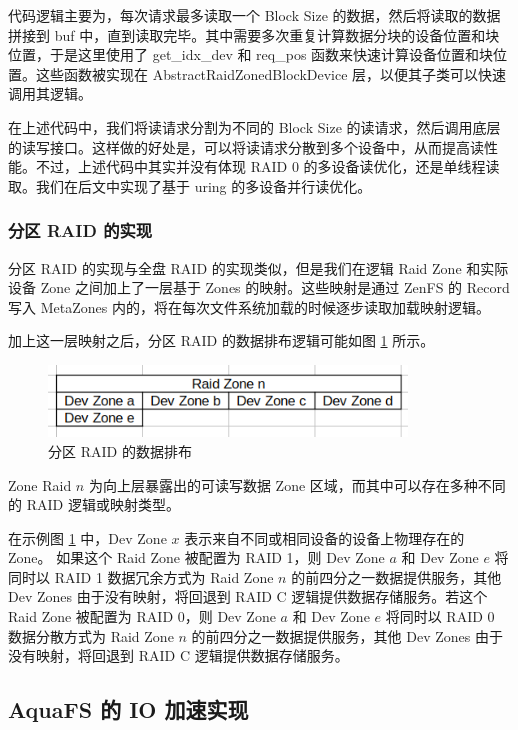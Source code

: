 代码逻辑主要为，每次请求最多读取一个 Block Size 的数据，然后将读取的数据拼接到 buf 中，直到读取完毕。其中需要多次重复计算数据分块的设备位置和块位置，于是这里使用了 get\_idx\_dev 和 req\_pos 函数来快速计算设备位置和块位置。这些函数被实现在 AbstractRaidZonedBlockDevice 层，以便其子类可以快速调用其逻辑。

在上述代码中，我们将读请求分割为不同的 Block Size 的读请求，然后调用底层的读写接口。这样做的好处是，可以将读请求分散到多个设备中，从而提高读性能。不过，上述代码中其实并没有体现 RAID 0 的多设备读优化，还是单线程读取。我们在后文中实现了基于 uring 的多设备并行读优化。

\subsubsection{分区 RAID 的实现}

分区 RAID 的实现与全盘 RAID 的实现类似，但是我们在逻辑 Raid Zone 和实际设备 Zone 之间加上了一层基于 Zones 的映射。这些映射是通过 ZenFS 的 Record 写入 MetaZones 内的，将在每次文件系统加载的时候逐步读取加载映射逻辑。

加上这一层映射之后，分区 RAID 的数据排布逻辑可能如图 \ref{raid-a} 所示。

\begin{figure}[htbp]
  \centering
  \includegraphics[width=0.85\textwidth]{fig/raid-a.png}
  \caption{ 分区 RAID 的数据排布 }
  \label{raid-a}
\end{figure}

Zone Raid $n$ 为向上层暴露出的可读写数据 Zone 区域，而其中可以存在多种不同的 RAID 逻辑或映射类型。

在示例图 \ref{raid-a} 中，Dev Zone $x$ 表示来自不同或相同设备的设备上物理存在的 Zone。
如果这个 Raid Zone 被配置为 RAID 1，则 Dev Zone $a$ 和 Dev Zone $e$ 将同时以 RAID 1 数据冗余方式为 Raid Zone $n$ 的前四分之一数据提供服务，其他 Dev Zones 由于没有映射，将回退到 RAID C 逻辑提供数据存储服务。若这个 Raid Zone 被配置为 RAID 0，则 Dev Zone $a$ 和 Dev Zone $e$ 将同时以 RAID 0 数据分散方式为 Raid Zone $n$ 的前四分之一数据提供服务，其他 Dev Zones 由于没有映射，将回退到 RAID C 逻辑提供数据存储服务。



\subsection{AquaFS 的 IO 加速实现}

